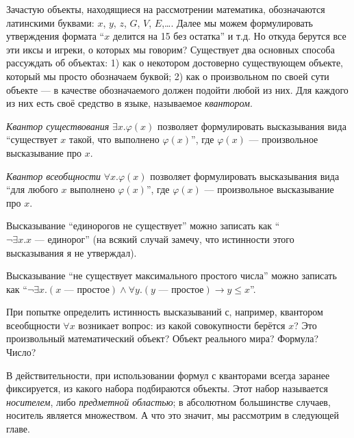 Зачастую объекты, находящиеся на рассмотрении математика, обозначаются
латинскими буквами: $x$, $y$, $z$, $G$, $V$, $E$,\dots. Далее мы можем
формулировать утверждения формата ``$x$ делится на 15 без остатка'' и т.д. Но
откуда берутся все эти иксы и игреки, о которых мы говорим? Существует два
основных способа рассуждать об объектах: 1) как о некотором достоверно
существующем объекте, который мы просто обозначаем буквой; 2) как о произвольном
по своей сути объекте --- в качестве обозначаемого должен подойти любой из них.
Для каждого из них есть своё средство в языке, называемое \textit{квантором}.

\textit{Квантор существования} $\exists x.\varphi(x)$ позволяет формулировать
высказывания вида ``существует $x$ такой, что выполнено $\varphi(x)$'', где
$\varphi(x)$ --- произвольное высказывание про $x$.

\textit{Квантор всеобщности} $\forall x.\varphi(x)$ позволяет формулировать
высказывания вида ``для любого $x$ выполнено $\varphi(x)$'', где $\varphi(x)$
--- произвольное высказывание про $x$.

\begin{ex}
  Высказывание ``единорогов не существует'' можно записать как
  ``$\neg\exists x.x\textrm{ --- единорог}$'' (на всякий случай замечу, что
  истинности этого высказывания я не утверждал).
\end{ex}

\begin{ex}
  Высказывание ``не существует максимального простого числа'' можно записать как
  ``$\neg\exists x.(x\textrm{ --- простое})\land
  \forall y.(y\textrm{ --- простое})\to y\leqslant x$''.
\end{ex}

При попытке определить истинность высказываний с, например, квантором
всеобщности $\forall x$ возникает вопрос: из какой совокупности берётся $x$? Это
произвольный математический объект? Объект реального мира? Формула? Число?

В действительности, при использовании формул с кванторами всегда заранее
фиксируется, из какого набора подбираются объекты. Этот набор называется
\textit{носителем}, либо \textit{предметной областью}; в абсолютном большинстве
случаев, носитель является множеством. А что это значит, мы рассмотрим в
следующей главе.
